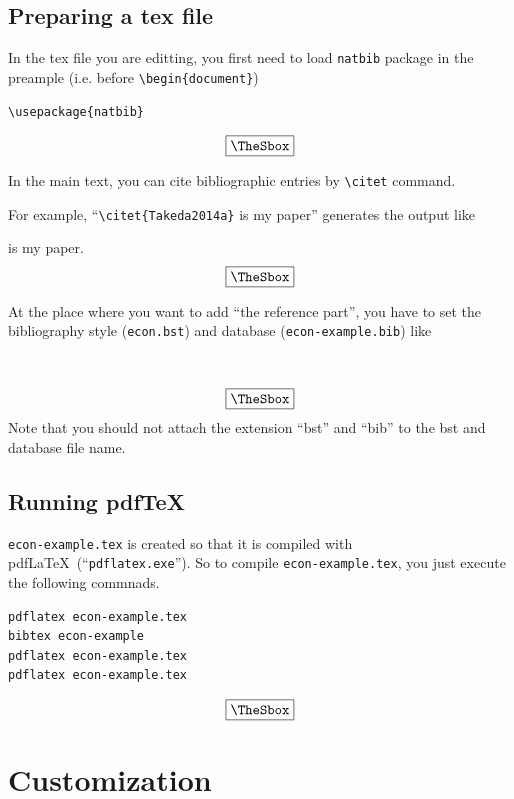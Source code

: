 \documentclass[10pt]{article}
\newenvironment{Frame}%
{\setlength{\fboxsep}{15pt}
\setlength{\mylength}{\linewidth}%
\addtolength{\mylength}{-2\fboxsep}%
\addtolength{\mylength}{-2\fboxrule}%
\Sbox
\minipage{\mylength}%
\setlength{\abovedisplayskip}{0pt}%
\setlength{\belowdisplayskip}{0pt}%
}%
{\endminipage\endSbox
\[\fbox{\TheSbox}\]}
\begin{document}
\subsection{Preparing a tex file}

In the tex file you are editting, you first need to load \texttt{natbib}
package in the preample (i.e. before \verb|\begin{document}|)
\begin{Frame}
\begin{verbatim}
\usepackage{natbib}
\end{verbatim}
\end{Frame}

In the main text, you can cite bibliographic entries by \verb|\citet|
command.

For example, ``\verb|\citet{Takeda2014a}| is my paper'' generates the output like
\begin{Frame}
\citet{Takeda2014a} is my paper.
\end{Frame}

At the place where you want to add ``the reference part'', you have to set the
bibliography style (\texttt{econ.bst}) and database (\texttt{econ-example.bib}) like
\begin{Frame}
\begin{verbatim}


\end{verbatim}
\end{Frame}
Note that you should not attach the extension ``bst'' and ``bib'' to the bst and
database file name.

\subsection{Running pdf\TeX{}}

\texttt{econ-example.tex} is created so that it is compiled with pdf\LaTeX\
(``\texttt{pdflatex.exe}''). So to compile \texttt{econ-example.tex}, you just
execute the following commnads.
\begin{Frame}
\begin{verbatim}
pdflatex econ-example.tex
bibtex econ-example
pdflatex econ-example.tex
pdflatex econ-example.tex
\end{verbatim}
\end{Frame}

\section{Customization}
\end{document}
